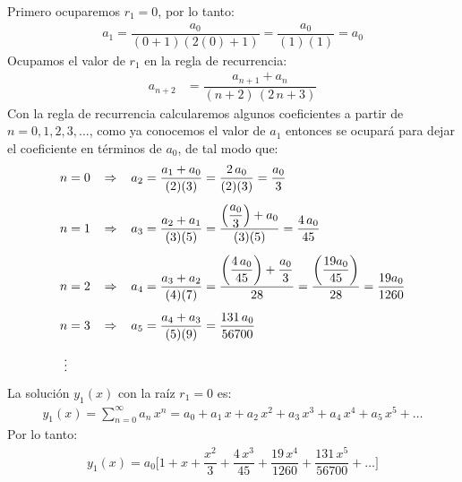\par
Primero ocuparemos $r_{1} = 0$, por lo tanto:
\begin{align*}
a_{1} = \dfrac{a_{0}}{(0+1)(2(0)+1)} = \dfrac{a_{0}}{(1)(1)} = a_{0}
\end{align*}
Ocupamos el valor de $r_{1}$ en la regla de recurrencia:
\begin{align*}
a_{n+2} &= \dfrac{a_{n+1} + a_{n}}{(n + 2) \, (2 \, n + 3)}
\end{align*}
Con la regla de recurrencia calcularemos algunos coeficientes a partir de $n = 0, 1, 2, 3, \ldots$, como ya conocemos el valor de $a_{1}$ entonces se ocupará para dejar el coeficiente en términos de $a_{0}$, de tal modo que:
\begin{align*}
n &= 0 \hspace{0.3cm} \Rightarrow \hspace{0.3cm} a_{2} = \dfrac{a_{1} + a_{0}}{(2)(3)} = \dfrac{2 \, a_{0}}{(2)(3)} = \dfrac{a_{0}}{3} \\[0.5em]
n &= 1 \hspace{0.3cm} \Rightarrow \hspace{0.3cm} a_{3} = \dfrac{a_{2} + a_{1}}{(3)(5)} = \dfrac{\left( \dfrac{a_{0}}{3} \right) + a_{0}}{(3)(5)} = \dfrac{4 \, a_{0}}{45} \\[0.5em]
n &= 2 \hspace{0.3cm} \Rightarrow \hspace{0.3cm} a_{4} = \dfrac{a_{3} + a_{2}}{(4)(7)} = \dfrac{\left( \dfrac{4 \, a_{0}}{45} \right) + \dfrac{a_{0}}{3}}{28} = \dfrac{ \left( \dfrac{19 a_{0}}{45}\right)}{28} = \dfrac{19 a_{0}}{1260} \\[0.5em]
n &= 3 \hspace{0.3cm} \Rightarrow \hspace{0.3cm} a_{5} = \dfrac{a_{4} + a_{3}}{(5)(9)} = \dfrac{131 \, a_{0}}{56700} \\[0.5em]
\vdots
\end{align*}
La solución $y_{1}(x)$ con la raíz $r_{1} = 0$ es:
\begin{align*}
y_{1}(x) = \sum_{n=0}^{\infty} a_{n} \, x^{n} = a_{0} + a_{1} \, x + a_{2} \, x^{2} + a_{3} \, x^{3} + a_{4} \, x^{4} + a_{5} \, x^{5} + \ldots
\end{align*}
Por lo tanto:
\begin{align}
y_{1}(x) = a_{0} \bigg[ 1 + x + \dfrac{x^{2}}{3}  + \dfrac{4 \, x^{3}}{45} + \dfrac{19 \, x^{4}}{1260} + \dfrac{131 \, x^{5}}{56700} + \ldots \bigg]
\end{align}
